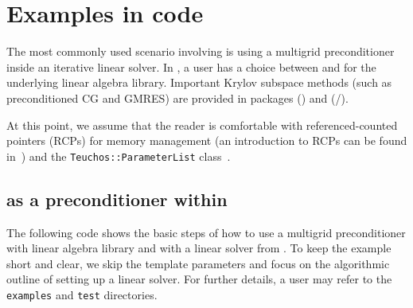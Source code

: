 \section{Examples in code}
\label{sec:examples in code}

The most commonly used scenario involving \muelu{} is using a multigrid
preconditioner inside an iterative linear solver. In \trilinos{}, a user has a
choice between \epetra and \tpetra for the underlying linear algebra library.
Important Krylov subspace methods (such as preconditioned CG and GMRES) are
provided in \trilinos{} packages \aztecoo (\epetra{}) and \belos
(\epetra{}/\tpetra{}).

At this point, we assume that the reader is comfortable with \teuchos{} referenced-counted
pointers (RCPs) for memory management (an introduction to RCPs can be found
in~\cite{RCP2010}) and the \texttt{Teuchos::ParameterList} class~\cite{TeuchosURL}.

\subsection{\muelu{} as a preconditioner within \belos}
\label{sec:tpetraexample}
The following code shows the basic steps of how to use a \muelu{}
multigrid preconditioner with \tpetra{} linear algebra library and with a linear
solver from \belos{}. To keep the example short and clear, we skip the template
parameters and focus on the algorithmic outline of setting up
a linear solver. For further details, a user may refer to the \texttt{examples} and
\texttt{test} directories.

